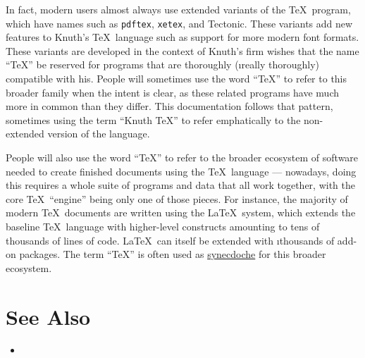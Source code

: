 In fact, modern users almost always use extended variants of the \TeX\ program,
which have names such as \texttt{pdftex}, \texttt{xetex}, and Tectonic. These
variants add new features to Knuth's \TeX\ language such as support for more
modern font formats. These variants are developed in the context of Knuth's firm
wishes that the name “\TeX” be reserved for programs that are thoroughly
(\i{really} thoroughly) compatible with his. People will sometimes use the word
“\TeX” to refer to this broader family when the intent is clear, as these
related programs have much more in common than they differ. This documentation
follows that pattern, sometimes using the term “Knuth \TeX” to refer
emphatically to the non-extended version of the language.

People will also use the word “\TeX” to refer to the broader ecosystem of
software needed to create finished documents using the \TeX\ language —
nowadays, doing this requires a whole suite of programs and data that all work
together, with the core \TeX\ “engine” being only one of those pieces. For
instance, the majority of modern \TeX\ documents are written using the \LaTeX\
system, which extends the baseline \TeX\ language with higher-level constructs
amounting to tens of thousands of lines of code. \LaTeX\ can itself be extended
with \i{thousands} of add-on packages. The term “\TeX” is often used as
\href{https://en.wikipedia.org/wiki/Synecdoche}{synecdoche} for this broader
ecosystem.


\section*{See Also}

\begin{itemize}
  \item {}
\end{itemize}